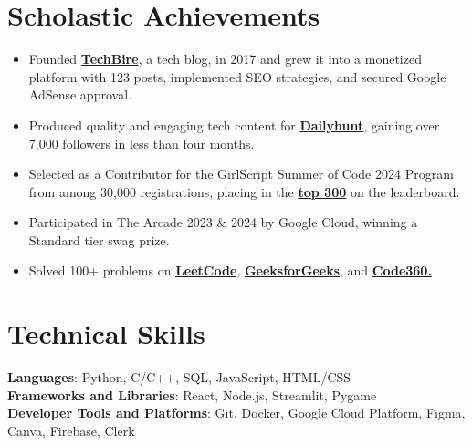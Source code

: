 \documentclass[letterpaper,11pt]{article}
\makeatletter
\newcommand{\resumeItem}[1]{
\item\small{
{#1 \vspace{-2pt}}
}
}
\newcommand{\resumeProjectHeading}[2]{
\item
\begin{tabular*}{0.97\textwidth}{l@{\extracolsep{\fill}}r}
\small#1 & #2 \\
\end{tabular*}\vspace{-7pt}
}
\newcommand{\resumeItemListStart}{\begin{itemize}}
\newcommand{\resumeItemListEnd}{\end{itemize}\vspace{-5pt}}
\makeatother
\begin{document}


\section{Scholastic Achievements}
\resumeItemListStart
\resumeItem{Founded \textbf{\href{https://techbire.blogspot.com/}{TechBire}}, a tech blog, in 2017 and grew it into a monetized platform with 123 posts, implemented SEO strategies, and secured Google AdSense approval.}
\resumeItem{Produced quality and engaging tech content for \textbf{\href{https://m.dailyhunt.in/profile/techbire}{Dailyhunt}}, gaining over 7,000 followers in less than four months.}
\resumeItem{Selected as a Contributor for the GirlScript Summer of Code 2024 Program from among 30,000 registrations, placing in the \textbf{\href{https://www.linkedin.com/posts/techbire_ranked-under-top-300-among-30000-registrations-activity-7228989489681997827-F8pa?utm_source=share&utm_medium=member_desktop}{top 300}} on the leaderboard.}
\resumeItem{Participated in The Arcade 2023 \& 2024 by Google Cloud, winning a Standard tier swag prize.}
\resumeItem{Solved 100+ problems on \textbf{\href{https://leetcode.com/u/techbire/}{LeetCode}}, \textbf{\href{https://www.geeksforgeeks.org/user/techbire/}{GeeksforGeeks}}, and \textbf{\href{https://www.naukri.com/code360/profile/techbire}{Code360.}}}

\resumeItemListEnd
\section{Technical Skills}
\begin{itemize}[leftmargin=0.15in, label={}]
\small{\item{
\textbf{Languages}{: Python, C/C++, SQL, JavaScript, HTML/CSS} \\
\textbf{Frameworks and Libraries}{: React, Node.js, Streamlit, Pygame} \\
\textbf{Developer Tools and Platforms}{: Git, Docker, Google Cloud Platform, Figma, Canva, Firebase, Clerk} \\
}}
\end{itemize}

\end{document}
